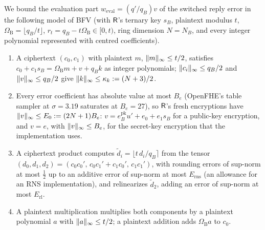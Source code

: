 We bound the evaluation part $w_{\mathrm{eval}}=(q'/q_B)v$ of the switched reply error in the following model of BFV (with $\mathsf{R}$'s ternary key $s_B$, plaintext modulus $t$, $\Omega_{\mathrm B}=\lfloor q_B/t\rfloor$, $r_t=q_B-t\Omega_{\mathrm B}\in[0,t)$, ring dimension $N=N_B$, and every integer polynomial represented with centred coefficients).
\begin{enumerate}[nosep,label=(B\arabic*)]
  \item A ciphertext $(c_0,c_1)$ with plaintext $m$, $\lVert m\rVert_\infty\le t/2$, satisfies $c_0+c_1s_B=\Omega_{\mathrm B}m+v+q_Bk$ as integer polynomials; $\lVert c_i\rVert_\infty\le q_B/2$ and $\lVert v\rVert_\infty\le q_B/2$ give $\lVert k\rVert_\infty\le\kappa_k:=(N+3)/2$.
  \item Every error coefficient has absolute value at most $B_e$ (OpenFHE's table sampler at $\sigma=3.19$ saturates at $B_e=27$), so $\mathsf{R}$'s fresh encryptions have $\lVert v\rVert_\infty\le E_0:=(2N+1)B_e$: $v=e^{\mathrm{pk}}_Bu'+e_0+e_1s_B$ for a public-key encryption, and $v=e$, with $\lVert v\rVert_\infty\le B_e$, for the secret-key encryption that the implementation uses.
  \item A ciphertext product computes $\tilde d_i=\lfloor t\,d_i/q_B\rceil$ from the tensor $(d_0,d_1,d_2)=(c_0c_0',\,c_0c_1'+c_1c_0',\,c_1c_1')$, with rounding errors of sup-norm at most $\tfrac12$ up to an additive error of sup-norm at most $E_{\mathrm{rns}}$ (an allowance for an RNS implementation), and relinearizes $\tilde d_2$, adding an error of sup-norm at most $E_{\mathrm{rl}}$.
  \item A plaintext multiplication multiplies both components by a plaintext polynomial $a$ with $\lVert a\rVert_\infty\le t/2$; a plaintext addition adds $\Omega_{\mathrm B}a$ to $c_0$.
\end{enumerate}

